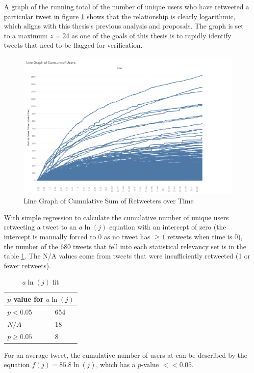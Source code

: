 \documentclass[preprint,review,12pt]{elsarticle}
\begin{document}
A graph of the running total of the number of unique users who have retweeted a particular tweet in figure \ref{fig:Users CumSum/Time} shows that the relationship is clearly logarithmic, which aligns with this thesis's previous analysis and proposals. The graph is set to a maximum $z = 24$ as one of the goals of this thesis is to rapidly identify tweets that need to be flagged for verification.
\begin{figure}[h!]
 \centering
  \includegraphics[width=12cm]{Linegraph cumsum users.png}
  \caption{Line Graph of Cumulative Sum of Retweeters over Time}\label{fig:Users CumSum/Time}
 \end{figure}
With simple regression to calculate the cumulative number of unique users retweeting a tweet to an $a\ln(j)$ equation with an intercept of zero (the intercept is manually forced to 0 as no tweet has $\geq 1$ retweets when time is 0), the number of the 680 tweets that fell into each statistical relevancy set is in the table \ref{Natural Log Fit}. The N/A values come from tweets that were insufficiently retweeted (1 or fewer retweets).   
\begin{table}[h!]
\centering
\begin{tabular}{ |p{3cm}|p{3cm}|  }
\hline
\multicolumn{2}{|c|}{$p$ value for $a\ln(j)$} \\
\hline
$p < 0.05$  & 654\\
$N/A$ & 18 \\
$ p \geq 0.05$ & 8 \\
\hline
\end{tabular}
\caption{$a\ln(j)$ fit}
\label{Natural Log Fit}
\end{table}

For an average tweet, the cumulative number of users at can be described by the equation $f(j)=85.8\ln(j)$, which has a $p$-value $<< 0.05$. 
\end{document}
